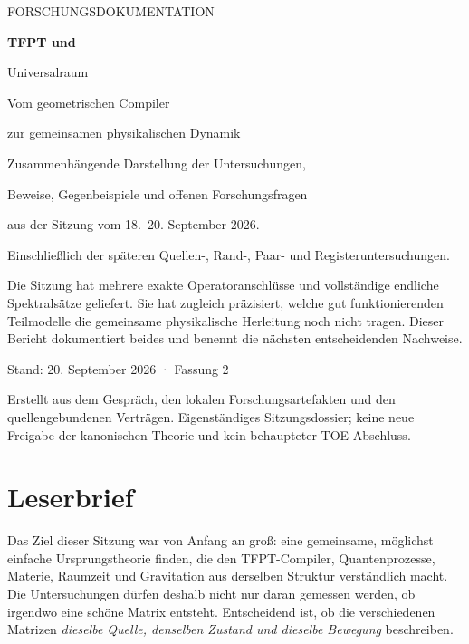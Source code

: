 \documentclass[11pt,a4paper,oneside,parskip=half,headings=normal,numbers=noenddot,bibliography=totoc]{scrreprt}
\newcommand{\finding}[2]{\begin{tcolorbox}[enhanced,breakable,colback=pale,colframe=teal,boxrule=0pt,borderline west={2pt}{0pt}{teal},arc=0mm,left=3mm,right=3mm,top=2mm,bottom=2mm,title={#1},coltitle=ink,colbacktitle=pale,fonttitle=\sffamily\bfseries]#2\end{tcolorbox}}
\begin{document}
\hypersetup{pageanchor=false}
\begin{titlepage}
\color{ink}
{\sffamily\large FORSCHUNGSDOKUMENTATION\par}
\vspace{17mm}
{\sffamily\bfseries\fontsize{32}{37}\selectfont TFPT und\par Universalraum\par}
\vspace{7mm}
{\sffamily\Large Vom geometrischen Compiler\par zur gemeinsamen physikalischen Dynamik\par}
\vspace{12mm}
\par
\vspace{9mm}
{\large Zusammenhängende Darstellung der Untersuchungen,\par Beweise, Gegenbeispiele und offenen Forschungsfragen\par aus der Sitzung vom 18.--20. September 2026.\par}
\vspace{3mm}
{\small Einschließlich der späteren Quellen-, Rand-, Paar- und Registeruntersuchungen.\par}
\vfill
\finding{Was dieser Bericht leistet}{Die Sitzung hat mehrere exakte Operatoranschlüsse und vollständige endliche Spektralsätze geliefert. Sie hat zugleich präzisiert, welche gut funktionierenden Teilmodelle die gemeinsame physikalische Herleitung noch nicht tragen. Dieser Bericht dokumentiert beides und benennt die nächsten entscheidenden Nachweise.}
\vspace{5mm}
{\sffamily Stand: 20. September 2026 · Fassung 2\par}
{\small Erstellt aus dem Gespräch, den lokalen Forschungsartefakten und den quellengebundenen Verträgen. Eigenständiges Sitzungsdossier; keine neue Freigabe der kanonischen Theorie und kein behaupteter TOE-Abschluss.\par}
\end{titlepage}
\hypersetup{pageanchor=true}
\chapter*{Leserbrief}
Das Ziel dieser Sitzung war von Anfang an groß: eine gemeinsame, möglichst einfache Ursprungstheorie finden, die den TFPT-Compiler, Quantenprozesse, Materie, Raumzeit und Gravitation aus derselben Struktur verständlich macht. Die Untersuchungen dürfen deshalb nicht nur daran gemessen werden, ob irgendwo eine schöne Matrix entsteht. Entscheidend ist, ob die verschiedenen Matrizen \emph{dieselbe Quelle, denselben Zustand und dieselbe Bewegung} beschreiben.
\end{document}
